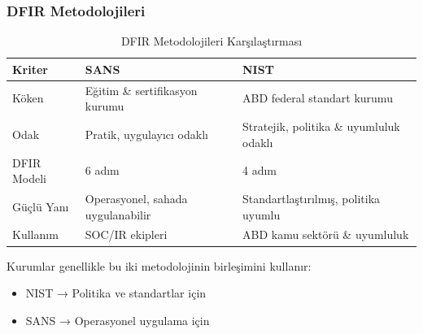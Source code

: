 \subsubsection{DFIR Metodolojileri}

\begin{table}[ht]
\centering
\begin{tabular}{|l|l|l|}
\hline
\textbf{Kriter} & \textbf{SANS} & \textbf{NIST} \\
\hline
Köken & Eğitim \& sertifikasyon kurumu & ABD federal standart kurumu \\
\hline
Odak & Pratik, uygulayıcı odaklı & Stratejik, politika \& uyumluluk odaklı \\
\hline
DFIR Modeli & 6 adım & 4 adım \\
\hline
Güçlü Yanı & Operasyonel, sahada uygulanabilir & Standartlaştırılmış, politika uyumlu \\
\hline
Kullanım & SOC/IR ekipleri & ABD kamu sektörü \& uyumluluk \\
\hline
\end{tabular}
\caption{DFIR Metodolojileri Karşılaştırması}
\end{table}

Kurumlar genellikle bu iki metodolojinin birleşimini kullanır:
\begin{itemize}
    \item NIST → Politika ve standartlar için
    \item SANS → Operasyonel uygulama için
\end{itemize}

